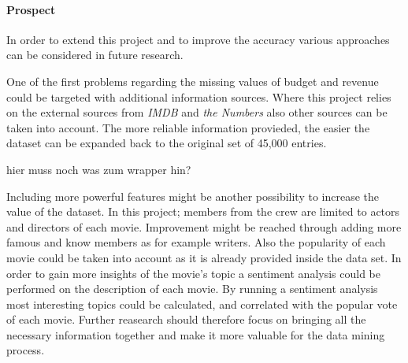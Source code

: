 \paragraph{Prospect}
In order to extend this project and to improve the accuracy various approaches can be considered in future research. 

One of the first problems regarding the missing values of budget and revenue could be targeted with additional information sources. Where this project relies on the external sources from \textit{IMDB } and \textit{the Numbers} also other sources can be taken into account. The more reliable information provieded, the easier the dataset can be expanded back to the original set of 45,000 entries.

\huge hier muss noch was zum wrapper hin?


\normalsize Including  more powerful features might be another possibility to increase the value of the dataset. In this project; members from the crew are limited to actors and directors of each movie. Improvement might be reached through adding more famous and know members as for example writers. Also the popularity of each movie could be taken into account as it is already provided inside the data set. 
In order to gain more insights of the movie's topic a sentiment analysis could be performed on the description of each movie. By running a sentiment analysis most interesting topics could be calculated, and correlated with the popular vote of each movie. Further reasearch should therefore focus on bringing all the necessary information together and make it more valuable for the data mining process.

%
